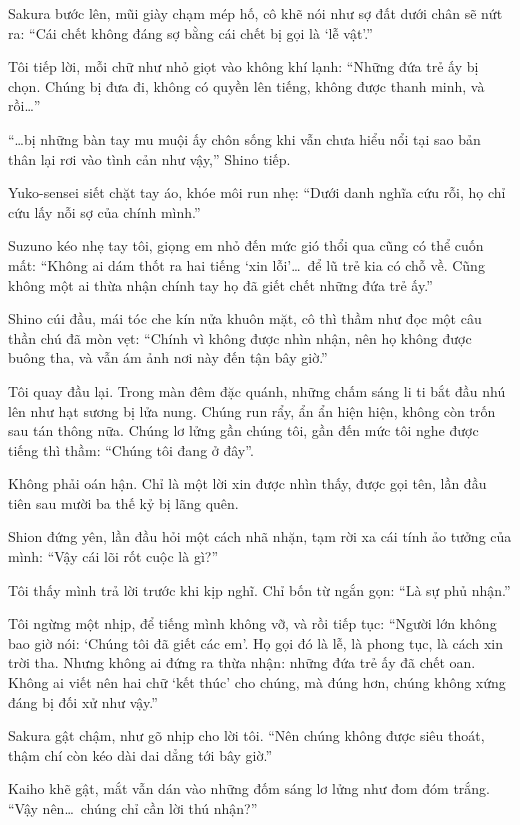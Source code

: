 \documentclass[../main.tex]{subfiles}
\begin{document}
Sakura bước lên, mũi giày chạm mép hố, cô khẽ nói như sợ đất dưới chân sẽ nứt ra: ``Cái chết không đáng sợ bằng cái chết bị gọi là `lễ vật'.''

Tôi tiếp lời, mỗi chữ như nhỏ giọt vào không khí lạnh: ``Những đứa trẻ ấy bị chọn. Chúng bị đưa đi, không có quyền lên tiếng, không được thanh minh, và rồi\dots''

``\dots bị những bàn tay mu muội ấy chôn sống khi vẫn chưa hiểu nổi tại sao bản thân lại rơi vào tình cản như vậy,'' Shino tiếp.

Yuko-sensei siết chặt tay áo, khóe môi run nhẹ: ``Dưới danh nghĩa cứu rỗi, họ chỉ cứu lấy nỗi sợ của chính mình.''

Suzuno kéo nhẹ tay tôi, giọng em nhỏ đến mức gió thổi qua cũng có thể cuốn mất: ``Không ai dám thốt ra hai tiếng `xin lỗi'\dots\ để lũ trẻ kia có chỗ về. Cũng không một ai thừa nhận chính tay họ đã giết chết những đứa trẻ ấy.''

Shino cúi đầu, mái tóc che kín nửa khuôn mặt, cô thì thầm như đọc một câu thần chú đã mòn vẹt: ``Chính vì không được nhìn nhận, nên họ không được buông tha, và vẫn ám ảnh nơi này đến tận bây giờ.''

Tôi quay đầu lại. Trong màn đêm đặc quánh, những chấm sáng li ti bắt đầu nhú lên như hạt sương bị lửa nung. Chúng run rẩy, ẩn ẩn hiện hiện, không còn trốn sau tán thông nữa. Chúng lơ lửng gần chúng tôi, gần đến mức tôi nghe được tiếng thì thầm: ``Chúng tôi đang ở đây''.

Không phải oán hận. Chỉ là một lời xin được nhìn thấy, được gọi tên, lần đầu tiên sau mười ba thế kỷ bị lãng quên.

Shion đứng yên, lần đầu hỏi một cách nhã nhặn, tạm rời xa cái tính ảo tưởng của mình: ``Vậy cái lõi rốt cuộc là gì?''

Tôi thấy mình trả lời trước khi kịp nghĩ. Chỉ bốn từ ngắn gọn: ``Là sự phủ nhận.''

Tôi ngừng một nhịp, để tiếng mình không vỡ, và rồi tiếp tục: ``Người lớn không bao giờ nói: `Chúng tôi đã giết các em'. Họ gọi đó là lễ, là phong tục, là cách xin trời tha. Nhưng không ai đứng ra thừa nhận: những đứa trẻ ấy đã chết oan. Không ai viết nên hai chữ `kết thúc' cho chúng, mà đúng hơn, chúng không xứng đáng bị đối xử như vậy.''

Sakura gật chậm, như gõ nhịp cho lời tôi. ``Nên chúng không được siêu thoát, thậm chí còn kéo dài dai dẳng tới bây giờ.''

Kaiho khẽ gật, mắt vẫn dán vào những đốm sáng lơ lửng như đom đóm trắng.
``Vậy nên\dots\ chúng chỉ cần lời thú nhận?''
\end{document}
